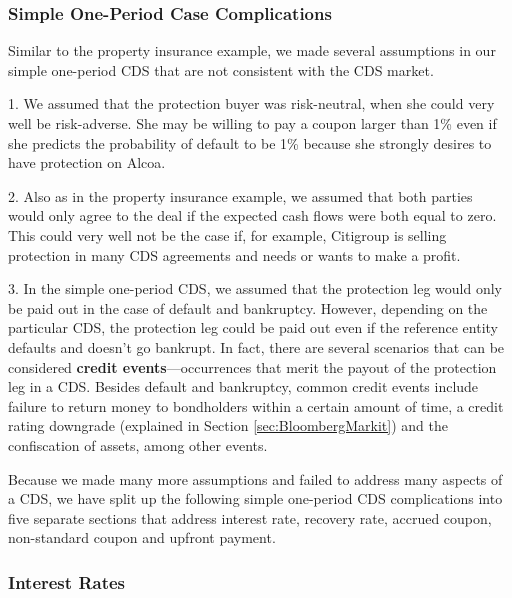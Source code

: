 \documentclass{jss}
\begin{document}
\subsubsection{Simple One-Period Case Complications}

Similar to the property insurance example, we made several assumptions in our simple one-period CDS that are not consistent with the CDS market. 

1. We assumed that the protection buyer was risk-neutral, when she could very well be risk-adverse. She may be willing to pay a coupon larger than 1\% even if she predicts the probability of default to be 1\% because she strongly desires to have protection on Alcoa.


2. Also as in the property insurance example, we assumed that both parties would only agree to the deal if the expected cash flows were both equal to zero. This could very well not be the case if, for example, Citigroup is selling protection in many CDS agreements and needs or wants to make a profit.

3. In the simple one-period CDS, we assumed that the protection leg would only be paid out in the case of default and bankruptcy. However, depending on the particular CDS, the protection leg could be paid out even if the reference entity defaults and doesn't go bankrupt. In fact, there are several scenarios that can be considered \textbf{credit events}---occurrences that merit the payout of the protection leg in a CDS. Besides default and bankruptcy, common credit events include failure to return money to bondholders within a certain amount of time, a credit rating downgrade (explained in Section \ref{sec:BloombergMarkit}) and the confiscation of assets, among other events.

Because we made many more assumptions and failed to address many aspects of a CDS, we have split up the following simple one-period CDS complications into five separate sections that address interest rate, recovery rate, accrued coupon, non-standard coupon and upfront payment. 

\subsubsection{Interest Rates}
\end{document}
